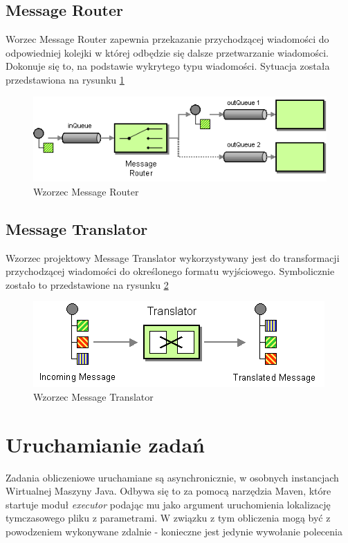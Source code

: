 \subsection{Message Router}
Worzec Message Router zapewnia przekazanie przychodzącej wiadomości do odpowiedniej kolejki w której odbędzie się dalsze przetwarzanie wiadomości.
Dokonuje się to, na podstawie wykrytego typu wiadomości.
Sytuacja została przedstawiona na rysunku \ref{fig:messageRouter}

\begin{figure}[!h]
 \centering
 \includegraphics[width=1.0\textwidth]{eip/MessageRouter}
 \caption{Wzorzec Message Router}
 \label{fig:messageRouter}
\end{figure}

\subsection{Message Translator}
Wzorzec projektowy Message Translator wykorzystywany jest do transformacji przychodzącej wiadomości do określonego formatu wyjściowego.
Symbolicznie zostało to przedstawione na rysunku \ref{fig:messageTranslator}

\begin{figure}[!h]
 \centering
 \includegraphics{eip/MessageTranslator}
 \caption{Wzorzec Message Translator}
 \label{fig:messageTranslator}
\end{figure}

\section{Uruchamianie zadań}

Zadania obliczeniowe uruchamiane są asynchronicznie, w osobnych instancjach Wirtualnej Maszyny Java.
Odbywa się to za pomocą narzędzia Maven, które startuje moduł {\it executor} podając mu jako argument uruchomienia lokalizację tymczasowego pliku z parametrami.
W związku z tym obliczenia mogą być z powodzeniem wykonywane zdalnie - konieczne jest jedynie wywołanie polecenia

